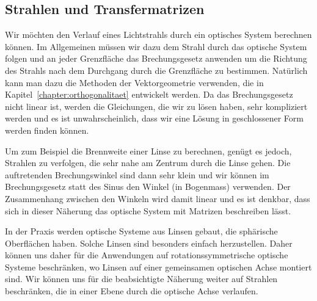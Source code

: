 %
%
%
\subsection{Strahlen und Transfermatrizen
\label{mo:subsection:transfermatrizen}}
Wir möchten den Verlauf eines Lichtstrahls durch ein optisches System
berechnen können.
Im Allgemeinen müssen wir dazu dem Strahl durch das optische System
folgen und an jeder Grenzfläche das Brechungsgesetz anwenden um die
Richtung des Strahls nach dem Durchgang durch die Grenzfläche zu
bestimmen.
Natürlich kann man dazu die Methoden der Vektorgeometrie verwenden,
die in Kapitel~\ref{chapter:orthogonalitaet} entwickelt werden.
Da das Brechungsgesetz nicht linear ist, werden die Gleichungen, die
wir zu lösen haben, sehr kompliziert werden und es ist unwahrscheinlich,
dass wir eine Lösung in geschlossener Form werden finden können.

Um zum Beispiel die Brennweite einer Linse zu berechnen, genügt es jedoch,
Strahlen zu verfolgen, die sehr nahe am Zentrum durch die Linse gehen.
Die auftretenden Brechungswinkel sind dann sehr klein und wir können im
Brechungsgesetz statt des Sinus den Winkel (in Bogenmass) verwenden.
Der Zusammenhang zwischen den Winkeln wird damit linear und es ist 
denkbar, dass sich in dieser Näherung das optische System mit Matrizen
beschreiben lässt.

In der Praxis werden optische Systeme aus Linsen gebaut, die 
sphärische Oberflächen haben.
Solche Linsen sind besonders einfach herzustellen.
Daher können uns daher für die Anwendungen auf rotationssymmetrische
optische Systeme beschränken, wo Linsen auf einer gemeinsamen
optischen Achse montiert sind.
Wir können uns für die beabsichtigte Näherung weiter auf Strahlen
beschränken, die in einer Ebene durch die optische Achse verlaufen.

